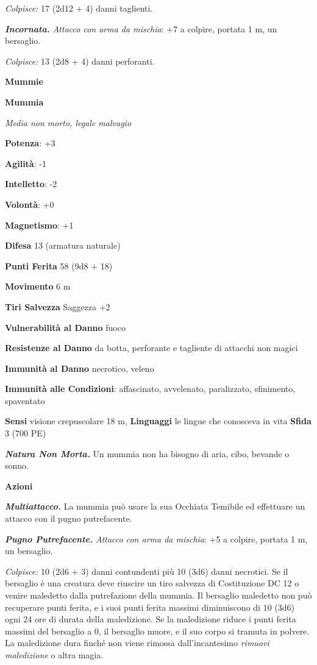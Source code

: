 \begin{multicols}{2}
\emph{Colpisce:} 17 (2d12 + 4) danni taglienti.

\emph{\textbf{Incornata.} Attacco con arma da mischia}: +7 a colpire,
portata 1 m, un bersaglio.

\emph{Colpisce:} 13 (2d8 + 4) danni perforanti.

\textbf{Mummie}

\textbf{Mummia}

\emph{Media non morto, legale malvagio}

\textbf{Potenza}: +3

\textbf{Agilità}: -1

\textbf{Intelletto}: -2

\textbf{Volontà}: +0

\textbf{Magnetismo}: +1

\textbf{Difesa} 13 (armatura naturale)

\textbf{Punti Ferita} 58 (9d8 + 18)

\textbf{Movimento} 6 m

\textbf{Tiri Salvezza} Saggezza +2

\textbf{Vulnerabilità al Danno} fuoco

\textbf{Resistenze al Danno} da botta, perforante e tagliente di
attacchi non magici

\textbf{Immunità al Danno} necrotico, veleno

\textbf{Immunità alle Condizioni}: affascinato, avvelenato, paralizzato,
sfinimento, spaventato

\textbf{Sensi} visione crepuscolare 18 m, 
\textbf{Linguaggi} le lingue che conosceva in vita \textbf{Sfida} 3 (700
PE)\smallskip

\emph{\textbf{Natura Non Morta.}} Un mummia non ha bisogno di aria,
cibo, bevande o sonno.

\smallskip\textbf{Azioni}

\emph{\textbf{Multiattacco.}} La mummia può usare la sua Occhiata
Temibile ed effettuare un attacco con il pugno putrefacente.

\emph{\textbf{Pugno Putrefacente.} Attacco con arma da mischia}: +5 a
colpire, portata 1 m, un bersaglio.

\emph{Colpisce:} 10 (2d6 + 3) danni contundenti più 10 (3d6) danni
necrotici. Se il bersaglio è una creatura deve riuscire un tiro salvezza
di Costituzione DC 12 o venire maledetto dalla putrefazione della
mummia. Il bersaglio maledetto non può recuperare punti ferita, e i suoi
punti ferita massimi diminuiscono di 10 (3d6) ogni 24 ore di durata
della maledizione. Se la maledizione riduce i punti ferita massimi del
bersaglio a 0, il bersaglio muore, e il suo corpo si tramuta in polvere.
La maledizione dura finché non viene rimossa dall'incantesimo
\emph{rimuovi maledizione} o altra magia.


\end{multicols}
